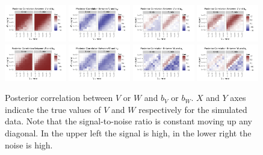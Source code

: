 \documentclass{article}
\begin{document}
\begin{figure}[!ht]
\centering
\includegraphics[width=0.24\textwidth]{corplot1}
\includegraphics[width=0.24\textwidth]{corplot2}
\includegraphics[width=0.24\textwidth]{corplot3}
\includegraphics[width=0.24\textwidth]{corplot4}
\includegraphics[width=0.24\textwidth]{corplot5}
\includegraphics[width=0.24\textwidth]{corplot6}
\includegraphics[width=0.24\textwidth]{corplot7}
\includegraphics[width=0.24\textwidth]{corplot8}
\caption{Posterior correlation between $V$ or $W$ and $b_V$ or $b_W$. $X$ and $Y$ axes indicate the true values of $V$ and $W$ respectively for the simulated data. Note that the signal-to-noise ratio is constant moving up any diagonal. In the upper left the signal is high, in the lower right the noise is high.}
\label{corplot}
\end{figure}
\end{document}
